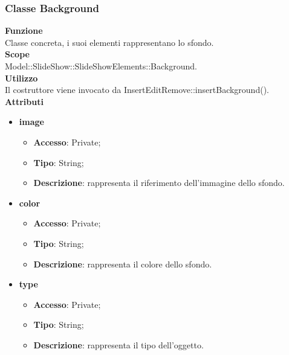 {	\subsubsection{Classe Background}{
		\label{Background}
		\textbf{Funzione}\\
			\indent Classe concreta, i suoi elementi rappresentano lo sfondo.\\
	   	\textbf{Scope}\\
			\indent Model::SlideShow::SlideShowElements::Background.\\
		\textbf{Utilizzo}\\
			\indent Il costruttore viene invocato da InsertEditRemove::insertBackground().\\
		\textbf{Attributi}
		\begin{itemize}
			\item \textbf{image}
			\begin{itemize}
				\item \textbf{Accesso}: Private;
				\item \textbf{Tipo}: String;
				\item \textbf{Descrizione}: rappresenta il riferimento dell’immagine dello sfondo.
			\end{itemize}
			\item \textbf{color}
			\begin{itemize}
				\item \textbf{Accesso}: Private;
				\item \textbf{Tipo}: String;
				\item \textbf{Descrizione}: rappresenta il colore dello sfondo.
			\end{itemize}
			\item \textbf{type}
			\begin{itemize}
				\item \textbf{Accesso}: Private;
				\item \textbf{Tipo}: String;
				\item \textbf{Descrizione}: rappresenta il tipo dell'oggetto.
			\end{itemize}
		\end{itemize}

		}
	}
